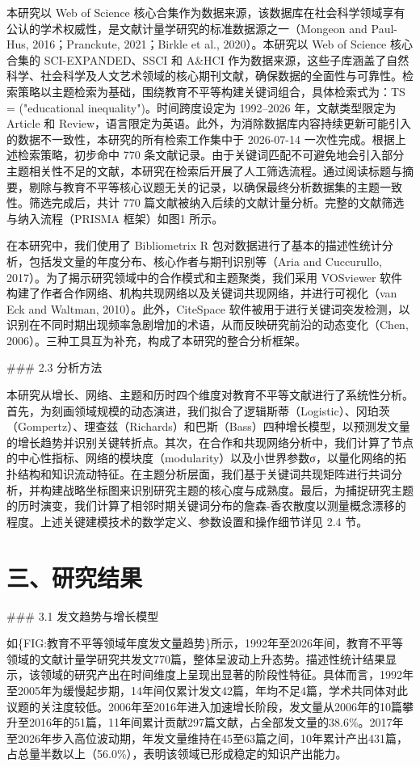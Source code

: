 \documentclass[12pt,a4paper]{article}
\begin{document}
本研究以 Web of Science 核心合集作为数据来源，该数据库在社会科学领域享有公认的学术权威性，是文献计量学研究的标准数据源之一（Mongeon and Paul-Hus, 2016；Pranckute, 2021；Birkle et al., 2020）。本研究以 Web of Science 核心合集的 SCI-EXPANDED、SSCI 和 A\&HCI 作为数据来源，这些子库涵盖了自然科学、社会科学及人文艺术领域的核心期刊文献，确保数据的全面性与可靠性。检索策略以主题检索为基础，围绕教育不平等构建关键词组合，具体检索式为：TS = ("educational inequality")。时间跨度设定为 1992–2026 年，文献类型限定为 Article 和 Review，语言限定为英语。此外，为消除数据库内容持续更新可能引入的数据不一致性，本研究的所有检索工作集中于 2026-07-14 一次性完成。根据上述检索策略，初步命中 770 条文献记录。由于关键词匹配不可避免地会引入部分主题相关性不足的文献，本研究在检索后开展了人工筛选流程。通过阅读标题与摘要，剔除与教育不平等核心议题无关的记录，以确保最终分析数据集的主题一致性。筛选完成后，共计 770 篇文献被纳入后续的文献计量分析。完整的文献筛选与纳入流程（PRISMA 框架）如图1 所示。

在本研究中，我们使用了 Bibliometrix R 包对数据进行了基本的描述性统计分析，包括发文量的年度分布、核心作者与期刊识别等（Aria and Cuccurullo, 2017）。为了揭示研究领域中的合作模式和主题聚类，我们采用 VOSviewer 软件构建了作者合作网络、机构共现网络以及关键词共现网络，并进行可视化（van Eck and Waltman, 2010）。此外，CiteSpace 软件被用于进行关键词突发检测，以识别在不同时期出现频率急剧增加的术语，从而反映研究前沿的动态变化（Chen, 2006）。三种工具互为补充，构成了本研究的整合分析框架。

\#\#\# 2.3 分析方法

本研究从增长、网络、主题和历时四个维度对教育不平等文献进行了系统性分析。首先，为刻画领域规模的动态演进，我们拟合了逻辑斯蒂（Logistic）、冈珀茨（Gompertz）、理查兹（Richards）和巴斯（Bass）四种增长模型，以预测发文量的增长趋势并识别关键转折点。其次，在合作和共现网络分析中，我们计算了节点的中心性指标、网络的模块度（modularity）以及小世界参数σ，以量化网络的拓扑结构和知识流动特征。在主题分析层面，我们基于关键词共现矩阵进行共词分析，并构建战略坐标图来识别研究主题的核心度与成熟度。最后，为捕捉研究主题的历时演变，我们计算了相邻时期关键词分布的詹森-香农散度以测量概念漂移的程度。上述关键建模技术的数学定义、参数设置和操作细节详见 2.4 节。

\section{三、研究结果}

\#\#\# 3.1 发文趋势与增长模型

如\{FIG:教育不平等领域年度发文量趋势\}所示，1992年至2026年间，教育不平等领域的文献计量学研究共发文770篇，整体呈波动上升态势。描述性统计结果显示，该领域的研究产出在时间维度上呈现出显著的阶段性特征。具体而言，1992年至2005年为缓慢起步期，14年间仅累计发文42篇，年均不足4篇，学术共同体对此议题的关注度较低。2006年至2016年进入加速增长阶段，发文量从2006年的10篇攀升至2016年的51篇，11年间累计贡献297篇文献，占全部发文量的38.6\%。2017年至2026年步入高位波动期，年发文量维持在45至63篇之间，10年累计产出431篇，占总量半数以上（56.0\%），表明该领域已形成稳定的知识产出能力。
\end{document}
